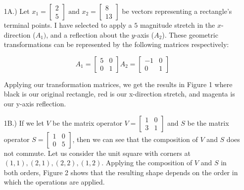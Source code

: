 \documentclass[10pt]{article}
\begin{document}
\noindent{}
\normalsize
\begin{enumerate}[leftmargin=\labelsep]
    \item[1A.)] Let $x_1 = \begin{bmatrix} 2 \\ 5 \end{bmatrix} \text{ and } x_2 = \begin{bmatrix} 8 \\ 13 \end{bmatrix}$ be vectors representing a rectangle's terminal points. 
    I have selected to apply a $5$ magnitude stretch in the $x$-direction ($A_1)$, and a reflection about the $y$-axis ($A_2$). These geometric transformations
    can be represented by the following matrices respectively:
    
    \[
        A_1 = 
        \begin{bmatrix}
            5 & 0 \\
            0 & 1
        \end{bmatrix} A_2 =
        \begin{bmatrix}
            -1 & 0 \\
            0 & 1
        \end{bmatrix} 
    \]
    
    Applying our transformation matrices, we get the results in Figure 1 where black is our original rectangle, red is our x-direction stretch, and magenta is our y-axis reflection.

    \item[1B.)] If we let $V$ be the matrix operator $V = \begin{bmatrix} 1 & 0 \\ 3 & 1 \end{bmatrix}$ and $S$ be the matrix operator $S = \begin{bmatrix} 1 & 0 \\ 0 & 5 \end{bmatrix}$, then we can see that the composition of $V$ and $S$ does not commute.
    Let us consider the unit square with corners at $(1, 1), (2, 1), (2, 2), (1, 2)$. Applying the composition of $V$ and $S$ in both orders, Figure 2 shows that the resulting shape depends on the order in which the operations are applied.
    

\end{enumerate}
\end{document}
